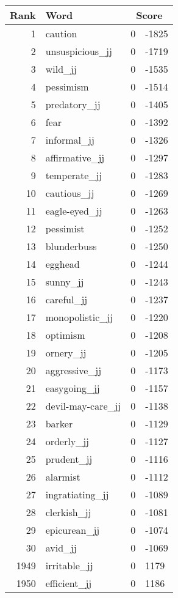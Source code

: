 \begin{longtable}[!htbp]{| rlr@{.}l |}
    \hline
    \textbf{Rank} & \textbf{Word} & \multicolumn{2}{c|}{\textbf{Score}} \\
    \hline
    \endhead
    1 & caution & 0 & -1825 \\
    2 & unsuspicious\_jj & 0 & -1719 \\
    3 & wild\_jj & 0 & -1535 \\
    4 & pessimism & 0 & -1514 \\
    5 & predatory\_jj & 0 & -1405 \\
    6 & fear & 0 & -1392 \\
    7 & informal\_jj & 0 & -1326 \\
    8 & affirmative\_jj & 0 & -1297 \\
    9 & temperate\_jj & 0 & -1283 \\
    10 & cautious\_jj & 0 & -1269 \\
    11 & eagle-eyed\_jj & 0 & -1263 \\
    12 & pessimist & 0 & -1252 \\
    13 & blunderbuss & 0 & -1250 \\
    14 & egghead & 0 & -1244 \\
    15 & sunny\_jj & 0 & -1243 \\
    16 & careful\_jj & 0 & -1237 \\
    17 & monopolistic\_jj & 0 & -1220 \\
    18 & optimism & 0 & -1208 \\
    19 & ornery\_jj & 0 & -1205 \\
    20 & aggressive\_jj & 0 & -1173 \\
    21 & easygoing\_jj & 0 & -1157 \\
    22 & devil-may-care\_jj & 0 & -1138 \\
    23 & barker & 0 & -1129 \\
    24 & orderly\_jj & 0 & -1127 \\
    25 & prudent\_jj & 0 & -1116 \\
    26 & alarmist & 0 & -1112 \\
    27 & ingratiating\_jj & 0 & -1089 \\
    28 & clerkish\_jj & 0 & -1081 \\
    29 & epicurean\_jj & 0 & -1074 \\
    30 & avid\_jj & 0 & -1069 \\
    1949 & irritable\_jj & 0 & 1179 \\
    1950 & efficient\_jj & 0 & 1186 \\

\end{longtable}
